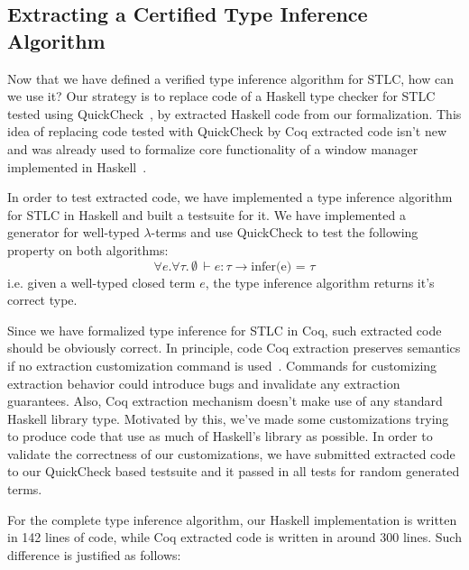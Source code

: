 \subsection{Extracting a Certified Type Inference Algorithm}

Now that we have defined a verified type inference algorithm for STLC,
how can we use it? Our strategy is to replace code of a Haskell type
checker for STLC tested using QuickCheck~\cite{Claessen00}, by
extracted Haskell code from our formalization. This idea of replacing
code tested with QuickCheck by Coq extracted code isn't new and was
already used to formalize core functionality of a window manager
implemented in Haskell~\cite{Swierstra12}.

In order to test extracted code, we have implemented a type inference
algorithm for STLC in Haskell and built a testsuite for it. We have
implemented a generator for well-typed $\lambda$-terms and use
QuickCheck to test the following property on both algorithms:
\[
   \forall e. \forall \tau. \, \emptyset\, \vdash e : \tau \to \text{infer(e) = } \tau
\]
i.e. given a well-typed closed term $e$, the type inference
algorithm returns it's correct type.

Since we have formalized type inference for STLC in Coq, such
extracted code should be obviously correct. In principle, code Coq
extraction preserves semantics if no extraction customization command
is used~\cite{Letouzey02}. Commands for customizing extraction
behavior could introduce bugs and invalidate any extraction
guarantees.  Also, Coq extraction mechanism doesn't make use of any
standard Haskell library type.  Motivated by this, we've made some
customizations trying to produce code that use as much of Haskell's
library as possible. In order to validate the correctness of our
customizations, we have submitted extracted code to our QuickCheck
based testsuite and it passed in all tests for random generated terms.

For the complete type inference algorithm, our Haskell implementation
is written in 142 lines of code, while Coq extracted code is written
in around 300 lines. Such difference is justified as follows:


